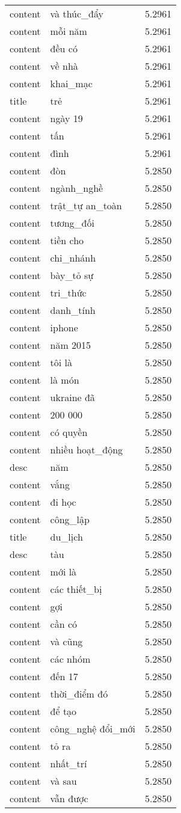 \documentclass{article}
\begin{document}
\begin{tabular}{lll}
content & và thúc\_đẩy & 5.2961\\
content & mỗi năm & 5.2961\\
content & đều có & 5.2961\\
content & về nhà & 5.2961\\
content & khai\_mạc & 5.2961\\
title & trẻ & 5.2961\\
content & ngày 19 & 5.2961\\
content & tấn & 5.2961\\
content & đình & 5.2961\\
content & đòn & 5.2850\\
content & ngành\_nghề & 5.2850\\
content & trật\_tự an\_toàn & 5.2850\\
content & tương\_đối & 5.2850\\
content & tiền cho & 5.2850\\
content & chi\_nhánh & 5.2850\\
content & bày\_tỏ sự & 5.2850\\
content & tri\_thức & 5.2850\\
content & danh\_tính & 5.2850\\
content & iphone & 5.2850\\
content & năm 2015 & 5.2850\\
content & tôi là & 5.2850\\
content & là món & 5.2850\\
content & ukraine đã & 5.2850\\
content & 200 000 & 5.2850\\
content & có quyền & 5.2850\\
content & nhiều hoạt\_động & 5.2850\\
desc & năm & 5.2850\\
content & vắng & 5.2850\\
content & đi học & 5.2850\\
content & công\_lập & 5.2850\\
title & du\_lịch & 5.2850\\
desc & tàu & 5.2850\\
content & mới là & 5.2850\\
content & các thiết\_bị & 5.2850\\
content & gợi & 5.2850\\
content & cần có & 5.2850\\
content & và cũng & 5.2850\\
content & các nhóm & 5.2850\\
content & đến 17 & 5.2850\\
content & thời\_điểm đó & 5.2850\\
content & để tạo & 5.2850\\
content & công\_nghệ đổi\_mới & 5.2850\\
content & tỏ ra & 5.2850\\
content & nhất\_trí & 5.2850\\
content & và sau & 5.2850\\
content & vẫn được & 5.2850\\
\bottomrule
\end{tabular}
\end{document}
